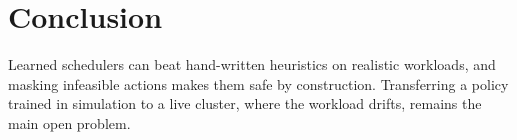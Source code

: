 \chapter{Conclusion}
\label{ch:conclusion}

Learned schedulers can beat hand-written heuristics on realistic workloads, and masking
infeasible actions makes them safe by construction. Transferring a policy trained in simulation
to a live cluster, where the workload drifts, remains the main open problem.
